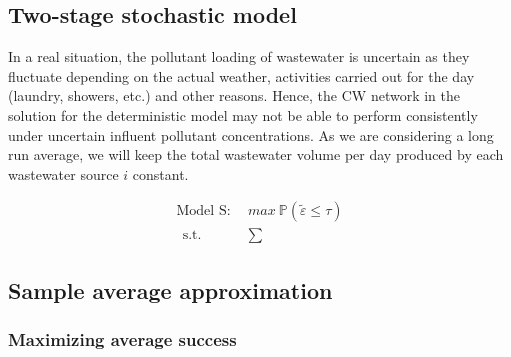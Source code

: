 \documentclass[preprint,12pt,authoryear]{elsarticle}
\newcommand{\bP}{\mathbb P}
\begin{document}
\pagebreak
\subsection{Two-stage stochastic model}\label{stomodel}
In a real situation, the pollutant loading of wastewater is uncertain as they fluctuate depending on the actual weather, activities carried out for the day (laundry, showers, etc.) and other reasons. Hence, the CW network in the solution for the deterministic model may not be able to perform consistently under uncertain influent pollutant concentrations. As we are considering a long run average, we will keep the total wastewater volume per day produced by each wastewater source $i$ constant. 

\begin{align}
	\text{Model S}:~~&max~\bP(\tilde{\varepsilon} \leq \tau) \nonumber\\~~
	\mbox{s.t.}~~
	&\sum 
\end{align}

\subsection{Sample average approximation}
%

\subsubsection{Maximizing average success}\label{maxsuccess}
\end{document}
